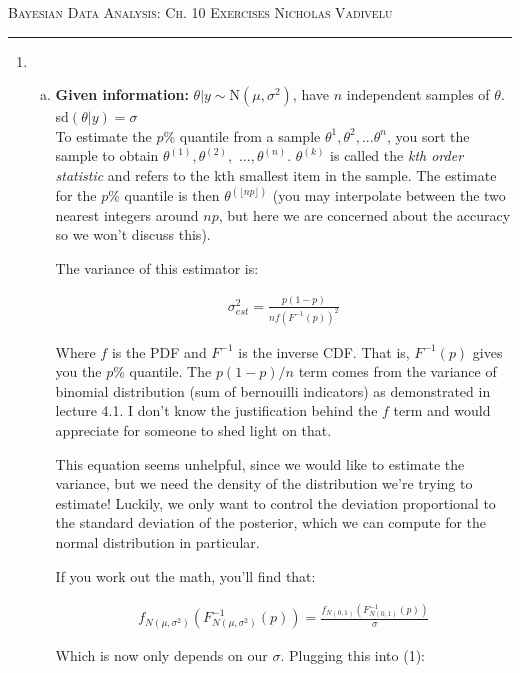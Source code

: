 \documentclass[12pt]{article}
\begin{document}
\textsc{Bayesian Data Analysis: Ch. 10 Exercises} \hfill \textsc{Nicholas Vadivelu}
\smallskip
\hrule
\bigskip

\begin{enumerate}[1.]

\item 
\begin{enumerate}[(a)]
\item \textbf{Given information:} $\theta|y \sim \mathrm{N}(\mu, \sigma^2)$, have $n$ independent samples of $\theta$. sd$(\theta|y) = \sigma$\\
    
To estimate the $p$\% quantile from a sample $\theta^1, \theta^2, ...\theta^n$, you sort the sample to obtain $\theta^{(1)}, \theta^{(2)},$ $..., \theta^{(n)}$. 
$\theta^{(k)}$ is called the \textit{kth order statistic} and refers to the kth smallest item in the sample. 
The estimate for the $p$\% quantile is then $\theta^{(\lfloor np \rfloor)}$ (you may interpolate between the two nearest integers around $np$, but here we are concerned about the accuracy so we won't discuss this).

The variance of this estimator is:

\begin{align}
\sigma_{est}^2 = \frac{p(1-p)}{n f(F^{-1}(p))^2}
\end{align}

Where $f$ is the PDF and $F^{-1}$ is the inverse CDF.
That is, $F^{-1}(p)$ gives you the $p$\% quantile.
The $p(1-p)/n$ term comes from the variance of binomial distribution (sum of bernouilli indicators) as demonstrated in lecture 4.1.
I don't know the justification behind the $f$ term and would appreciate for someone to shed light on that.

This equation seems unhelpful, since we would like to estimate the variance, but we need the density of the distribution we're trying to estimate!
Luckily, we only want to control the deviation proportional to the standard deviation of the posterior, which we can compute for the normal distribution in particular.

If you work out the math, you'll find that:

\begin{align}
f_{N(\mu, \sigma^2)}(F_{N(\mu, \sigma^2)}^{-1}(p)) = \frac{f_{N(0, 1)}(F_{N(0, 1)}^{-1}(p))}{\sigma}
\end{align}

Which is now only depends on our $\sigma$.
Plugging this into (1):



\end{enumerate}
\end{enumerate}
\end{document}
